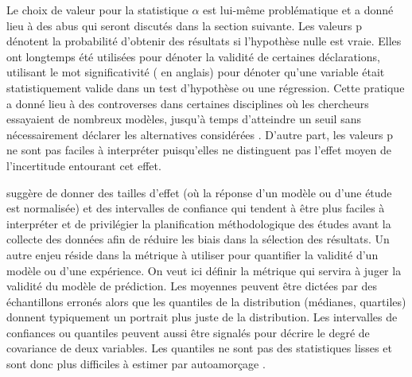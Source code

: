             Le choix de valeur pour la statistique $\alpha$ est lui-même problématique et a donné lieu à des abus qui seront discutés dans la section suivante.
            Les valeurs p dénotent la probabilité d'obtenir des résultats si l'hypothèse nulle est vraie. Elles ont longtemps été utilisées pour dénoter la validité de certaines déclarations, utilisant le mot significativité  (\fg{} en anglais) pour dénoter qu'une variable était statistiquement valide dans un test d'hypothèse ou une régression. Cette pratique a donné lieu à des controverses dans certaines disciplines où les chercheurs essayaient de nombreux modèles, jusqu'à temps d'atteindre un seuil sans nécessairement déclarer les alternatives considérées \parencite{wasserstein_asa_2016,vidgen_p-values_2016}.  D'autre part, les valeurs p ne sont pas faciles à interpréter \parencite{cumming_understanding_2012} puisqu'elles ne distinguent pas l'effet moyen de l'incertitude entourant cet effet.\par
            \textcite{cumming_understanding_2012} suggère de donner des tailles d'effet (où la réponse d'un modèle ou d'une étude est normalisée) et des intervalles de confiance qui tendent à être plus faciles à interpréter et de privilégier la planification méthodologique des études avant la collecte des données afin de réduire les biais dans la sélection des résultats. 
            Un autre enjeu réside dans la métrique à utiliser pour quantifier la validité d'un modèle ou d'une expérience. On veut ici définir la métrique qui servira à juger la validité du modèle de prédiction. Les moyennes peuvent être dictées par des échantillons erronés alors que les quantiles de la distribution (médianes, quartiles) donnent typiquement un portrait plus juste de la distribution. Les intervalles de confiances ou quantiles peuvent aussi être signalés pour décrire le degré de covariance de deux variables. Les quantiles ne sont pas des statistiques lisses et sont donc plus difficiles à estimer par autoamorçage \parencite{davison_bootstrap_1999}. \par
            
